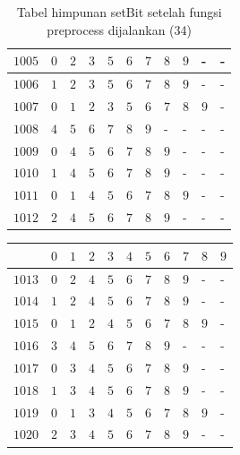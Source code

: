 \begin{appendices}
\begin{table}[H]
\begin{tabular} {|l|l|l|l|l|l|l|l|l|l|l|}
  		$ 1005 $ & $ 0 $ &$ 2 $ &$ 3 $ &$ 5 $ &$ 6 $ &$ 7 $ &$ 8 $ &$ 9 $ & - &  -   \\ \hline
  		$ 1006 $ & $ 1 $ &$ 2 $ &$ 3 $ &$ 5 $ &$ 6 $ &$ 7 $ &$ 8 $ &$ 9 $ & - &  -   \\ \hline
  		$ 1007 $ & $ 0 $ &$ 1 $ &$ 2 $ &$ 3 $ &$ 5 $ &$ 6 $ &$ 7 $ &$ 8 $ &$ 9 $ & -   \\ \hline
  		$ 1008 $ & $ 4 $ &$ 5 $ &$ 6 $ &$ 7 $ &$ 8 $ &$ 9 $ & - &  - &  - &  -   \\ \hline
  		$ 1009 $ & $ 0 $ &$ 4 $ &$ 5 $ &$ 6 $ &$ 7 $ &$ 8 $ &$ 9 $ & - &  - &  -   \\ \hline
  		$ 1010 $ & $ 1 $ &$ 4 $ &$ 5 $ &$ 6 $ &$ 7 $ &$ 8 $ &$ 9 $ & - &  - &  -   \\ \hline
  		$ 1011 $ & $ 0 $ &$ 1 $ &$ 4 $ &$ 5 $ &$ 6 $ &$ 7 $ &$ 8 $ &$ 9 $ & - &  -   \\ \hline
  		$ 1012 $ & $ 2 $ &$ 4 $ &$ 5 $ &$ 6 $ &$ 7 $ &$ 8 $ &$ 9 $ & - &  - &  -   \\ \hline  		
  	\end{tabular}\caption{Tabel himpunan setBit setelah fungsi preprocess dijalankan (34)}
  	\label{tab:setbit_34}
  \end{table}
  \begin{table}[H]
  	\centering
  	\begin{tabular} {|l|l|l|l|l|l|l|l|l|l|l|} \hline
  		\backslashbox{$Num$}{$index$} & $ 0 $ & $ 1 $ & $ 2 $ & $ 3 $ & $ 4 $ & $ 5 $ & $ 6 $ & $ 7 $ & $ 8 $ & $ 9 $ \\ \hline
  		$ 1013 $ & $ 0 $ &$ 2 $ &$ 4 $ &$ 5 $ &$ 6 $ &$ 7 $ &$ 8 $ &$ 9 $ & - &  -   \\ \hline
  		$ 1014 $ & $ 1 $ &$ 2 $ &$ 4 $ &$ 5 $ &$ 6 $ &$ 7 $ &$ 8 $ &$ 9 $ & - &  -   \\ \hline
  		$ 1015 $ & $ 0 $ &$ 1 $ &$ 2 $ &$ 4 $ &$ 5 $ &$ 6 $ &$ 7 $ &$ 8 $ &$ 9 $ & -   \\ \hline
  		$ 1016 $ & $ 3 $ &$ 4 $ &$ 5 $ &$ 6 $ &$ 7 $ &$ 8 $ &$ 9 $ & - &  - &  -   \\ \hline
  		$ 1017 $ & $ 0 $ &$ 3 $ &$ 4 $ &$ 5 $ &$ 6 $ &$ 7 $ &$ 8 $ &$ 9 $ & - &  -   \\ \hline
  		$ 1018 $ & $ 1 $ &$ 3 $ &$ 4 $ &$ 5 $ &$ 6 $ &$ 7 $ &$ 8 $ &$ 9 $ & - &  -   \\ \hline
  		$ 1019 $ & $ 0 $ &$ 1 $ &$ 3 $ &$ 4 $ &$ 5 $ &$ 6 $ &$ 7 $ &$ 8 $ &$ 9 $ & -   \\ \hline
  		$ 1020 $ & $ 2 $ &$ 3 $ &$ 4 $ &$ 5 $ &$ 6 $ &$ 7 $ &$ 8 $ &$ 9 $ & - &  -   \\ \hline

\end{tabular}
\end{table}
\end{appendices}

